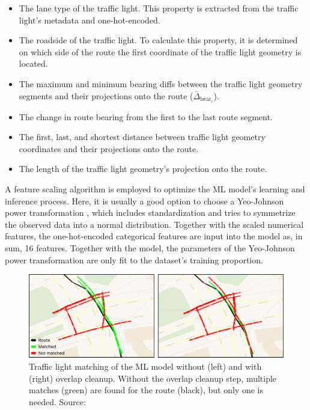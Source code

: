 \begin{itemize}
    \item The lane type of the traffic light. This property is extracted from the traffic light's metadata and one-hot-encoded.
    \item The roadside of the traffic light. To calculate this property, it is determined on which side of the route the first coordinate of the traffic light geometry is located.
    \item The maximum and minimum bearing diffs between the traffic light geometry segments and their projections onto the route ($\bar{\Delta}_{\text{bear}_i}$).
    \item The change in route bearing from the first to the last route segment. 
    \item The first, last, and shortest distance between traffic light geometry coordinates and their projections onto the route.
    \item The length of the traffic light geometry's projection onto the route.
\end{itemize}

A feature scaling algorithm is employed to optimize the ML model's learning and inference process. Here, it is usually a good option to choose a Yeo-Johnson power transformation \cite{yeo_new_2000}, which includes standardization and tries to symmetrize the observed data into a normal distribution. Together with the scaled numerical features, the one-hot-encoded categorical features are input into the model as, in sum, 16 features. Together with the model, the parameters of the Yeo-Johnson power transformation are only fit to the dataset's training proportion.

\begin{figure}[t]
\centering
\includegraphics[width=\linewidth]{images/sg-selection-overlap-cleanup.pdf}
\caption{Traffic light matching of the ML model without (left) and with (right) overlap cleanup. Without the overlap cleanup step, multiple matches (green) are found for the route (black), but only one is needed. Source: \cite{matthes2023geo}}
\label{fig:sg-selection-overlap-cleanup}
\end{figure}

